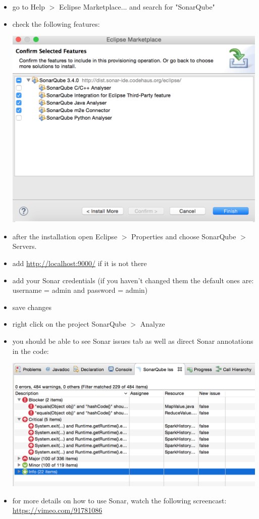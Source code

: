 \documentclass{article}
\begin{document}
\begin{itemize}
\item go to Help $>$ Eclipse Marketplace... and search for "SonarQube"
\item check the following features:
\begin{center}
\includegraphics[scale=0.5]{figures/ss6}
\end{center}
\item after the installation open Eclipse $>$ Properties and choose
  SonarQube $>$ Servers.
\item add  \url{http://localhost:9000/} if it is not there
\item add your Sonar credentials (if you haven't changed them the
  default ones are: username = admin and password = admin)
\item save changes
\item right click on the project SonarQube $>$ Analyze
\item you should be able to see Sonar issues tab as well as direct
  Sonar annotations in the code:
\begin{center}
\includegraphics[scale=0.3]{figures/ss7.png}
\end{center}
\item for more details on how to use Sonar, watch the following
  screencast: \url{https://vimeo.com/91781086}
\end{itemize}
\end{document}
